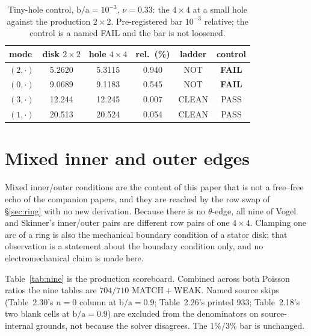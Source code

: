 \documentclass[11pt]{article}
\newcommand{\ba}{\mbox{b/a}}
\begin{document}
\begin{table}[htbp]\centering\small
\caption{Tiny-hole control, $\ba=10^{-3}$, $\nu=0.33$: the $4\times4$ at a
small hole against the production $2\times2$. Pre-registered bar $10^{-3}$
relative; the control is a named FAIL and the bar is not loosened.}
\label{tab:tinyhole}
\begin{tabular}{lccccc}
\toprule
mode & disk $2\times2$ & hole $4\times4$ & rel.\ (\%) & ladder & control\\
\midrule
$(2,\cdot)$ & 5.2620 & 5.3115 & 0.940 & NOT & \textbf{FAIL} \\
$(0,\cdot)$ & 9.0689 & 9.1183 & 0.545 & NOT & \textbf{FAIL} \\
$(3,\cdot)$ & 12.244 & 12.245 & 0.007 & CLEAN & PASS \\
$(1,\cdot)$ & 20.513 & 20.524 & 0.054 & CLEAN & PASS \\
\bottomrule
\end{tabular}
\end{table}

\FloatBarrier
\section{Mixed inner and outer edges}\label{sec:mixed}
Mixed inner/outer conditions are the content of this paper that is not a
free--free echo of the companion papers, and they are reached by the row swap
of \S\ref{sec:ring} with no new derivation. Because there is no $\theta$-edge,
all nine of Vogel and Skinner's inner/outer pairs are different row pairs of
one $4\times4$. Clamping one arc of a ring is also the mechanical boundary
condition of a stator disk; that observation is a statement about the
boundary condition only, and no electromechanical claim is made here.

Table~\ref{tab:nine} is the production scoreboard. Combined across both
Poisson ratios the nine tables are $704/710$ MATCH${}+{}$WEAK. Named source
skips (Table~2.30's $n=0$ column at $\ba=0.9$; Table~2.26's printed $933$;
Table~2.18's two blank cells at $\ba=0.9$) are excluded from the
denominators on source-internal grounds, not because the solver disagrees.
The $1\%/3\%$ bar is unchanged.
\end{document}
